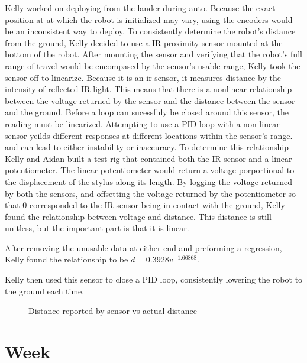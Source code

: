 \documentclass{article}
\begin{document}
Kelly worked on deploying from the lander during auto. Because the exact position at at which the robot is initialized may vary, using the encoders would be an inconsistent way to deploy. To consistently determine the robot's distance from the ground, Kelly decided to use a IR proximity sensor mounted at the bottom of the robot. After mounting the sensor and verifying that the robot's full range of travel would be encompased by the sensor's usable range, Kelly took the sensor off to linearize. Because it is an ir sensor, it measures distance by the intensity of reflected IR light. This means that there is a nonlinear relationship between the voltage returned by the sensor and the distance between the sensor and the ground. Before a loop can sucessfuly be closed around this sensor, the reading must be linearized. Attempting to use a PID loop with a non-linear sensor yeilds different responses at different locations within the sensor's range. and can lead to either instability or inaccuracy. To determine this relationship Kelly and Aidan built a test rig that contained both the IR sensor and a linear potentiometer. The linear potentiometer would return a voltage porportional to the displacement of the stylus along its length. By logging the voltage returned by both the sensors, and offsetting the voltage returned by the potentiometer so that 0 corresponded to the IR sensor being in contact with the ground, Kelly found the relationship between voltage and distance. This distance is still unitless, but the important part is that it is linear.

After removing the unusable data at either end and preforming a regression, Kelly found the relationship to be $d=0.3928 v^{-1.66868}$. 

Kelly then used this sensor to close a PID loop, consistently lowering the robot to the ground each time.


\begin {figure}
\centering
{}
\caption {Distance reported by sensor vs actual distance}
\label {fig:graph}
\end{figure}
\clearpage \newpage \section{Week \thesection} 
\end{document}
